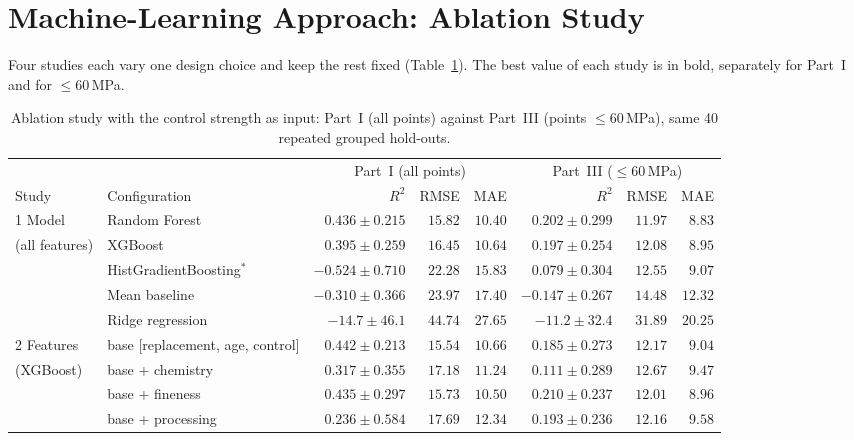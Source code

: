 \documentclass[11pt]{article}
\newcommand{\R}{$R^2$}
\begin{document}
\section{Machine-Learning Approach: Ablation Study}
\label{sec:p3-ml}
Four studies each vary one design choice and keep the rest fixed
(Table~\ref{tab:p3abl}). The best value of each study is in bold, separately for
Part~I and for $\leq60$\,MPa.

\begin{table}[tbp]
\centering\small
\caption{Ablation study with the control strength as input: Part~I (all points) against
Part~III (points $\leq60$\,MPa), same 40 repeated grouped hold-outs.}
\label{tab:p3abl}
\begin{adjustbox}{max width=\linewidth}
\begin{tabular}{llrrrrrr}
\toprule
& & \multicolumn{3}{c}{Part~I (all points)} & \multicolumn{3}{c}{Part~III ($\leq60$\,MPa)} \\
\cmidrule(lr){3-5}\cmidrule(lr){6-8}
Study & Configuration & \R{} & RMSE & MAE & \R{} & RMSE & MAE \\
\midrule
1 Model & Random Forest & $\mathbf{0.436\pm0.215}$ & $\mathbf{15.82}$ & $\mathbf{10.40}$ & $\mathbf{0.202\pm0.299}$ & $\mathbf{11.97}$ & $\mathbf{8.83}$ \\
\quad (all features) & XGBoost & $0.395\pm0.259$ & $16.45$ & $10.64$ & $0.197\pm0.254$ & $12.08$ & $8.95$ \\
 & HistGradientBoosting$^{*}$ & $-0.524\pm0.710$ & $22.28$ & $15.83$ & $0.079\pm0.304$ & $12.55$ & $9.07$ \\
 & Mean baseline & $-0.310\pm0.366$ & $23.97$ & $17.40$ & $-0.147\pm0.267$ & $14.48$ & $12.32$ \\
 & Ridge regression & $-14.7\pm46.1$ & $44.74$ & $27.65$ & $-11.2\pm32.4$ & $31.89$ & $20.25$ \\
\midrule
2 Features & base [replacement, age, control] & $\mathbf{0.442\pm0.213}$ & $\mathbf{15.54}$ & $10.66$ & $0.185\pm0.273$ & $12.17$ & $9.04$ \\
\quad (XGBoost) & base + chemistry & $0.317\pm0.355$ & $17.18$ & $11.24$ & $0.111\pm0.289$ & $12.67$ & $9.47$ \\
 & base + fineness & $0.435\pm0.297$ & $15.73$ & $\mathbf{10.50}$ & $0.210\pm0.237$ & $12.01$ & $8.96$ \\
 & base + processing & $0.236\pm0.584$ & $17.69$ & $12.34$ & $0.193\pm0.236$ & $12.16$ & $9.58$ \\

\end{tabular}
\end{adjustbox}
\end{table}
\end{document}
